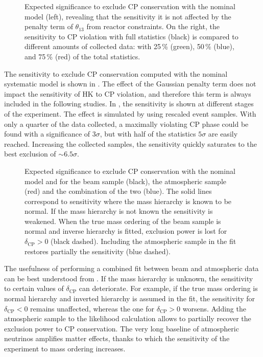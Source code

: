 \begin{figure}
	\centering
	\resizebox{0.49\linewidth}{!}{}
	\resizebox{0.49\linewidth}{!}{}
	\caption[Sensitivity to $\delta_\text{CP}$ with the nominal systematic model]%
		{Expected significance to exclude CP conservation with the nominal model (left), %
		revealing that the sensitivity it is not affected by the penalty term of $\theta_{13}$ %
		from reactor constraints.
		On the right, the sensitivity to CP violation with full statistics (black) is compared %
		to different amounts of collected data: %
		with 25\,\% (green), 50\,\% (blue), and 75\,\% (red) of the total statistics.}
	\label{fig:nominal_sensitivity}
\end{figure}


The sensitivity to exclude CP conservation computed with the nominal systematic model %
is shown in .
The effect of the Gaussian penalty term does not impact the sensitivity of HK to CP violation, and %
therefore this term is always included in the following studies.
In , the sensitivity is shown at different stages of the experiment.
The effect is simulated by using rescaled event samples.
With only a quarter of the data collected, a maximally violating CP phase could be found with a significance of $3\sigma$, %
but with half of the statistics $5\sigma$ are easily reached.
Increasing the collected samples, the sensitivity quickly saturates to the best exclusion of $\sim6.5\sigma$.

\begin{figure}
	\centering
	\resizebox{0.7\linewidth}{!}{}
	\caption[Sensitivity to $\delta_\text{CP}$ with the nominal model and unknown hierarchy]%
		{Expected significance to exclude CP conservation with the nominal model and %
		for the beam sample (black), the atmospheric sample (red) and the combination of the two (blue).
		The solid lines correspond to sensitivity where the mass hierarchy is known to be normal.
		If the mass hierarchy is not known the sensitivity is weakened.
		When the true mass ordering of the beam sample is normal and inverse hierarchy is fitted, %
		exclusion power is lost for $\delta_\text{CP} > 0$ (black dashed).
		Including the atmospheric sample in the fit restores partially the sensitivity (blue dashed).}
	\label{fig:combined_sens}
\end{figure}

The usefulness of performing a combined fit between beam and atmospheric %
data can be best understood from .
If the mass hierarchy is unknown, the sensitivity to certain values of $\delta_\text{CP}$ can deteriorate.
For example, if the true mass ordering is normal hierarchy and inverted hierarchy is assumed in the fit, %
the sensitivity for $\delta_\text{CP} < 0$ remains unaffected, whereas the one for $\delta_\text{CP} > 0$ worsens.
Adding the atmospheric sample to the likelihood calculation allows to partially recover the exclusion power to CP conservation.
The very long baseline of atmospheric neutrinos amplifies matter effects, thanks to which the sensitivity %
of the experiment to mass ordering increases.


